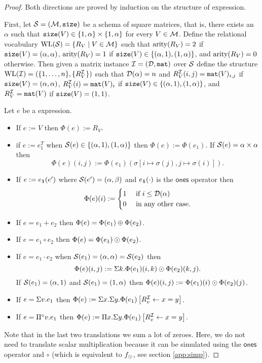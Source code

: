 \begin{proof}
Both directions are proved by induction on the structure of expression.

First, let $\mathcal{S}=(\mathcal{M},\texttt{size})$ be a schema of square matrices, that is, there exists an $\alpha$ such 
that $\texttt{size}(V) \in \{1, \alpha\} \times \{1,\alpha\}$ for every $V \in \mathcal{M}$.
Define the relational vocabulary $\text{WL}(\mathcal{S}) = \{R_V \mid V \in \mathcal{M}\}$ such that $\operatorname{arity}(R_V) = 2$ 
if $\texttt{size}(V) = (\alpha, \alpha)$, $\operatorname{arity}(R_V) = 1$ if $\texttt{size}(V) \in \{(\alpha,1), (1,\alpha)\}$, and 
$\operatorname{arity}(R_V) = 0$ otherwise.
Then given a matrix instance $\mathcal{I} = (\mathcal{D},\texttt{mat})$ over $\mathcal{S}$ define the structure 
$\text{WL}(\mathcal{I}) = (\{1, \ldots, n\}, \{R_V^{\mathcal{I}}\} )$ such that $\mathcal{D}(\alpha) = n$ and 
$R_V^{\mathcal{I}}(i, j) = \texttt{mat}(V)_{i,j}$ if $\texttt{size}(V) = (\alpha, \alpha)$, $R_V^{\mathcal{I}}(i) = \texttt{mat}(V)_{i}$ 
if $\texttt{size}(V) \in \{(\alpha,1), (1,\alpha)\}$, and $R_V^{\mathcal{I}} = \texttt{mat}(V)$ if $\texttt{size}(V) = (1,1)$.

Let $e$ be a \langprod expression.
\begin{itemize}
  \item If $e:=V$ then $\Phi(e):=R_V$.
  \item if $e:= e_1^T$ when $\mathcal{S}(e)\in \{(\alpha,1), (1,\alpha)\}$ then $\Phi(e):=\Phi(e_1)$. If $\mathcal{S}(e)=\alpha\times\alpha$ then
  $$
  \Phi(e)(i,j):=\Phi(e_1)(\sigma\left[ i\mapsto \sigma(j), j\mapsto \sigma(i) \right]).
  $$
  \item If $e:=e_{\mathbf{1}}(e')$ where $\mathcal{S}(e')=(\alpha, \beta)$ and $e_{\mathbf{1}}(\cdot)$ is the $\mathsf{ones}$ operator 
  then
  \[
\Phi(e)(i) := \begin{cases}
1& \text{ if } i\leq\mathcal{D}(\alpha)\ \\
0 & \text{ in any other case.} 
\end{cases}
\]
  \item If $e=e_1+e_2$ then $\Phi(e)=\Phi(e_1)\oplus \Phi(e_2)$.
  \item If $e=e_1\circ e_2$ then $\Phi(e)=\Phi(e_1)\odot \Phi(e_2)$.
  \item If $e=e_1\cdot e_2$ when $\mathcal{S}(e_1)=(\alpha, \alpha)= \mathcal{S}(e_2)$ then 
  $$
  \Phi(e)(i,j):=\Sigma k. \Phi(e_1)(i,k)\odot\Phi(e_2)(k,j). 
  $$
  If $\mathcal{S}(e_1)=(\alpha, 1)$ and $\mathcal{S}(e_1)=(1, \alpha)$ then $\Phi(e)(i,j):=\Phi(e_1)(i)\odot\Phi(e_2)(j)$.
  \item If $e=\Sigma v. e_1$ then $\Phi(e):=\Sigma x.\Sigma y.\Phi(e_1)\left[ R_v^{\mathcal{I}}\gets x=y \right]$.
  \item If $e=\Pi^{\circ} v. e_1$ then $\Phi(e):=\Pi x.\Sigma y.\Phi(e_1)\left[ R_v^{\mathcal{I}}\gets x=y \right]$.
\end{itemize}
Note that in the last two translations we sum a lot of zeroes. Here, we do not need to translate scalar multiplication
because it can be simulated using the $\mathsf{ones}$ operator and $\circ$ (which is equivalent to $f_{\odot}$, see section \ref{app:simp}).


\end{proof}
